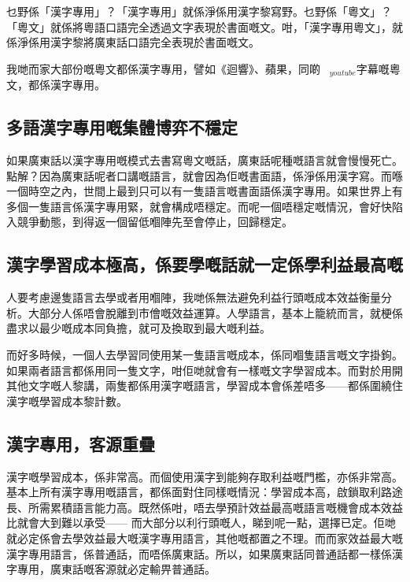   
  
  
  
  
乜野係「漢字專用」？「漢字專用」就係淨係用漢字黎寫野。乜野係「粵文」？「粵文」就係將粵語口語完全透過文字表現於書面嘅文。咁，「漢字專用粵文」，就係淨係用漢字黎將廣東話口語完全表現於書面嘅文。

我哋而家大部份嘅粵文都係漢字專用，譬如《迴響》、蘋果，同啲$_{youtube}$字幕嘅粵文，都係漢字專用。

\subsection*{多語漢字專用嘅集體博弈不穩定}
如果廣東話以漢字專用嘅模式去書寫粵文嘅話，廣東話呢種嘅語言就會慢慢死亡。點解？因為廣東話呢者口講嘅語言，就會因為佢嘅書面語，係淨係用漢字寫。而喺一個時空之內，世間上最到只可以有一隻語言嘅書面語係漢字專用。如果世界上有多個一隻語言係漢字專用緊，就會構成唔穩定。而呢一個唔穩定嘅情況，會好快陷入競爭動態，到得返一個留低嗰陣先至會停止，回歸穩定。

\subsection*{漢字學習成本極高，係要學嘅話就一定係學利益最高嘅}
人要考慮邊隻語言去學或者用嗰陣，我哋係無法避免利益行頭嘅成本效益衡量分析。大部分人係唔會脫離到市儈嘅效益運算。人學語言，基本上籠統而言，就梗係盡求以最少嘅成本同負擔，就可及換取到最大嘅利益。

而好多時候，一個人去學習同使用某一隻語言嘅成本，係同嗰隻語言嘅文字掛鉤。如果兩者語言都係用同一隻文字，咁佢哋就會有一樣嘅文字學習成本。而對於用開其他文字嘅人黎講，兩隻都係用漢字嘅語言，學習成本會係差唔多——都係圍繞住漢字嘅學習成本黎計數。

\subsection*{漢字專用，客源重疊}

漢字嘅學習成本，係非常高。而個使用漢字到能夠存取利益嘅門檻，亦係非常高。基本上所有漢字專用嘅語言，都係面對住同樣嘅情況：學習成本高，啟鎖取利路途長、所需累積語言能力高。既然係咁，唔去學預計效益最高嘅語言嘅機會成本效益比就會大到難以承受—— 而大部分以利行頭嘅人，睇到呢一點，選擇已定。佢哋就必定係會去學效益最大嘅漢字專用語言，其他嘅都置之不理。而而家效益最大嘅漢字專用語言，係普通話，而唔係廣東話。所以，如果廣東話同普通話都一樣係漢字專用，廣東話嘅客源就必定輸畀普通話。

